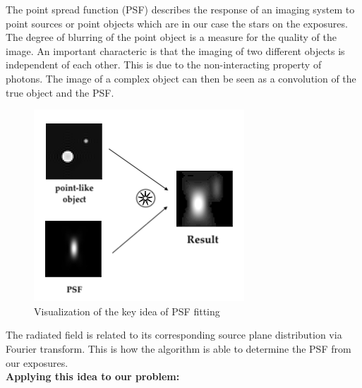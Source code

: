 The point spread function (PSF) describes the response of an imaging system to point sources or point objects which are in our case the stars on the exposures. The degree of blurring  of the point object is a measure for the quality of the image.
An important characteric is that the imaging of two different objects is independent of each other. This is due to the non-interacting property of photons. The image of a complex object can then be seen as a convolution of the true object and the PSF.
\begin{figure}[H]
	\centering
	\includegraphics[scale=0.5]{figures/Introduction/psf}
	\caption{Visualization of the key idea of PSF fitting}
\end{figure}
The radiated field is related to its corresponding source plane distribution via Fourier transform. This is how the algorithm is able to determine the PSF from our exposures. \\

\textbf{Applying this idea to our problem:} \\

